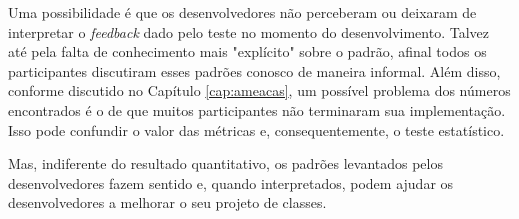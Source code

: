 Uma possibilidade é que os desenvolvedores não perceberam ou deixaram
de interpretar o \textit{feedback} dado pelo teste no momento do desenvolvimento.
Talvez até pela falta de conhecimento mais "explícito" sobre o padrão, afinal
todos os participantes discutiram esses padrões conosco de maneira informal. 
Além disso, conforme discutido no Capítulo \ref{cap:ameacas}, um possível
problema dos números encontrados é o de que muitos participantes não terminaram
sua implementação. Isso pode confundir o valor das métricas e, consequentemente,
o teste estatístico.

Mas, indiferente do resultado quantitativo, os padrões levantados pelos 
desenvolvedores fazem sentido e, quando interpretados, podem ajudar os desenvolvedores
a melhorar o seu projeto de classes.


